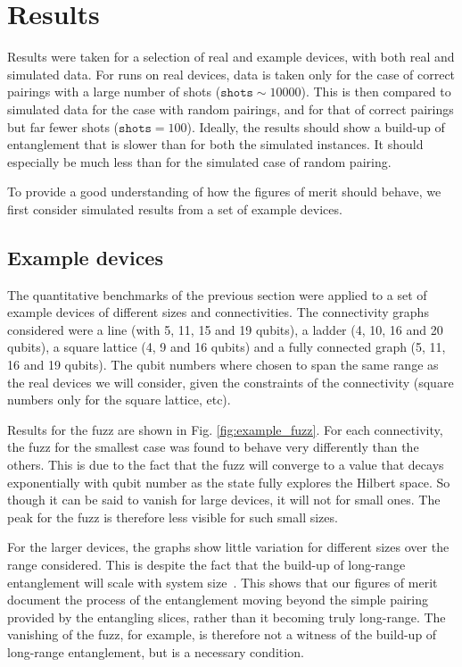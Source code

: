 \documentclass[aps,prl,twocolumn,showpacs,preprintnumbers]{revtex4-1}
\begin{document}
\section{Results}

Results were taken for a selection of real and example devices, with both real and simulated data. For runs on real devices, data is taken only for the case of correct pairings with a large number of shots ($\mathtt{shots}\sim 10000$). This is then compared to simulated data for the case with random pairings, and for that of correct pairings but far fewer shots ($\mathtt{shots} = 100$). Ideally, the results should show a build-up of entanglement that is slower than for both the simulated instances. It should especially be much less than for the simulated case of random pairing.

To provide a good understanding of how the figures of merit should behave, we first consider simulated results from a set of example devices.

\subsection{Example devices} \label{subsec:example}

The quantitative benchmarks of the previous section were applied to a set of example devices of different sizes and connectivities. The connectivity graphs considered were a line (with 5, 11, 15 and 19 qubits), a ladder (4, 10, 16 and 20 qubits), a square lattice (4, 9 and 16 qubits) and a fully connected graph (5, 11, 16 and 19 qubits). The qubit numbers where chosen to span the same range as the real devices we will consider, given the constraints of the connectivity (square numbers only for the square lattice, etc).


Results for the fuzz are shown in Fig. \ref{fig:example_fuzz}. For each connectivity, the fuzz for the smallest case was found to behave very differently than the others. This is due to the fact that the fuzz will converge to a value that decays exponentially with qubit number as the state fully explores the Hilbert space. So though it can be said to vanish for large devices, it will not for small ones. The peak for the fuzz is therefore less visible for such small sizes.

For the larger devices, the graphs show little variation for different sizes over the range considered. This is despite the fact that the build-up of long-range entanglement will scale with system size~\cite{boixo:18}. This shows that our figures of merit document the process of the entanglement moving beyond the simple pairing provided by the entangling slices, rather than it becoming truly long-range. The vanishing of the fuzz, for example, is therefore not a witness of the build-up of long-range entanglement, but is a necessary condition.
\end{document}
